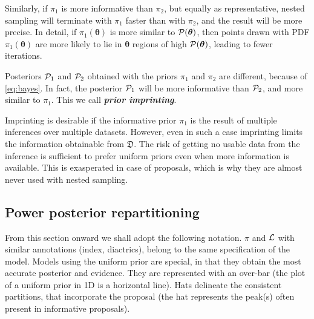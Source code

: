 \documentclass[usenatbib]{mnras}
\begin{document}
Similarly, if $\pi_{1}$ is more informative than $\pi_{2}$, but
equally as representative, nested sampling will terminate with
$\pi_{1}$ faster than with $\pi_{2}$, and the result will be more
precise. In detail, if \(\pi_{1} (\bm{\theta})\) is more similar to
\( {\cal P} (\bm{\theta})\), then points drawn with PDF
\(\pi_{1} (\bm{\theta})\) are more likely to lie in $\bm{\theta}$
regions of high \( {\cal P} (\bm{\theta})\), leading to fewer
iterations.

Posteriors ${\cal P}_{1}$ and ${\cal P}_{2}$ obtained with the priors
$\pi_{1}$ and $\pi_{2}$ are different, because of \cref{eq:bayes}. In
fact, the posterior ${\cal P}_{1}$ will be more informative than
${\cal P}_{2}$, and more similar to $\pi_{1}$. This we call
\textbf{\emph{prior imprinting}}.


Imprinting is desirable if the informative prior $\pi_{1}$ is the
result of multiple inferences over multiple datasets. However, even in
such a case imprinting limits the information obtainable from
\(\mathfrak{D}\). The risk of getting no usable data from the
inference is sufficient to prefer uniform priors even when more
information is available. This is exasperated in case of proposals,
which is why they are almost never used with nested sampling.


\subsection{Power posterior repartitioning}\label{sec:autopr}
From this section onward we shall adopt the following notation. $\pi$
and ${\cal L}$ with similar annotations (index, diactrics), belong to
the same specification of the model. Models using the uniform prior
are special, in that they obtain the most accurate posterior and
evidence. They are represented with an over-bar (the plot of a uniform
prior in 1D is a horizontal line). Hats delineate the consistent
partitions, that incorporate the proposal (the hat represents the
peak(s) often present in informative proposals).
\end{document}
